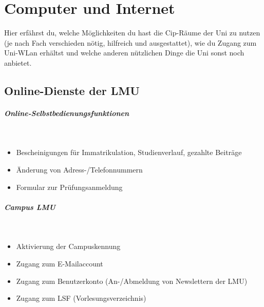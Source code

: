 ﻿\chapter{Computer und Internet}

Hier erfährst du, welche Möglichkeiten du hast die Cip-Räume der Uni zu nutzen (je nach
Fach verschieden nötig, hilfreich und ausgestattet), wie du Zugang zum Uni-WLan erhältst 
und welche anderen nützlichen Dinge die Uni sonst noch anbietet.

\section{Online-Dienste der LMU}
\paragraph{Online-Selbstbedienungsfunktionen}\hfill\\
\begin{itemize}
	\item Bescheinigungen für Immatrikulation, Studienverlauf, gezahlte Beiträge
	\item Änderung von Adress-/Telefonnummern
	\item Formular zur Prüfungsanmeldung
\end{itemize}
\begin{urlList}
\end{urlList}

\paragraph{Campus LMU}\hfill\\
\begin{itemize}
	\item Aktivierung der Campuskennung
	\item Zugang zum E-Mailaccount
	\item Zugang zum Benutzerkonto (An-/Abmeldung von Newslettern der LMU)
	\item Zugang zum LSF (Vorlesungsverzeichnis)
\end{itemize}
\begin{urlList}
\end{urlList}

